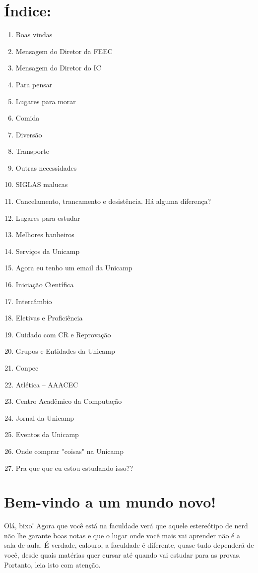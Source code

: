 \section{Índice:}
\begin{enumerate}
    \item  Boas vindas
    \item  Mensagem do Diretor da FEEC
    \item  Mensagem do Diretor do IC
    \item  Para pensar
    \item  Lugares para morar
    \item  Comida
    \item  Diversão
    \item  Transporte
    \item  Outras necessidades
    \item  SIGLAS malucas
    \item  Cancelamento, trancamento e desistência. Há alguma diferença?
    \item  Lugares para estudar
    \item  Melhores banheiros
    \item  Serviços da Unicamp
    \item  Agora eu tenho um email da Unicamp
    \item  Iniciação Científica
    \item  Intercâmbio
    \item  Eletivas e Proficiência
    \item  Cuidado com CR e Reprovação
    \item  Grupos e Entidades da Unicamp
    \item  Conpec
    \item  Atlética -- AAACEC
    \item  Centro Acadêmico da Computação
    \item  Jornal da Unicamp
    \item  Eventos da Unicamp
    \item  Onde comprar "coisas" na Unicamp
    \item  Pra que que eu estou estudando isso??
\end{enumerate}

\section{Bem-vindo a um mundo novo!}
Olá, bixo! Agora que você está na faculdade verá que aquele estereótipo de nerd
não lhe garante boas notas e que o lugar onde você mais vai aprender não
é a sala de aula. É verdade, calouro, a faculdade é diferente, quase tudo
dependerá de você, desde quais matérias quer cursar até quando vai estudar para
as provas. Portanto, leia isto com atenção.

